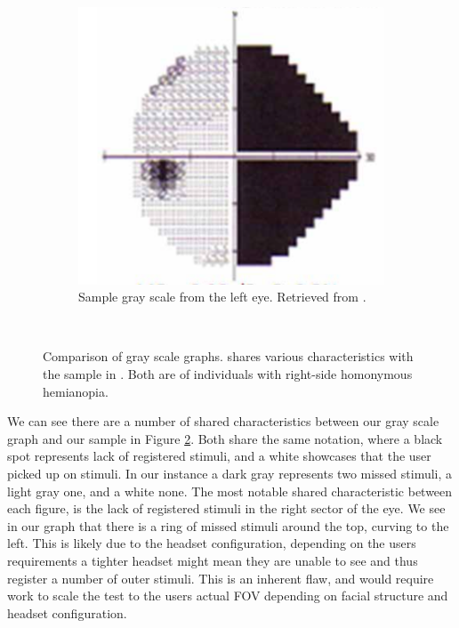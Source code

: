 \documentclass{l4proj}
\begin{document}
\begin{figure}[htbp]
\begin{subfigure}[b]{0.49\textwidth}
        \includegraphics[width=\textwidth]{dissertation/images/sample_left_gs.png}
        \caption{Sample gray scale from the left eye. Retrieved from \citet{perez2014rehabilitation}.}
        \label{fig:sample_left_gs}
    \end{subfigure}
    ~  
    \caption{Comparison of gray scale graphs.  shares various characteristics with the sample in . Both are of individuals with right-side homonymous hemianopia.}\label{fig:gs_comparison}
\end{figure}
\newline
We can see there are a number of shared characteristics between our gray scale graph and our sample in Figure \ref{fig:gs_comparison}. Both share the same notation, where a black spot represents lack of registered stimuli, and a white showcases that the user picked up on stimuli. In our instance a dark gray represents two missed stimuli, a light gray one, and a white none. The most notable shared characteristic between each figure, is the lack of registered stimuli in the right sector of the eye. We see in our graph that there is a ring of missed stimuli around the top, curving to the left. This is likely due to the headset configuration, depending on the users requirements a tighter headset might mean they are unable to see and thus register a number of outer stimuli. This is an inherent flaw, and would require work to scale the test to the users actual FOV depending on facial structure and headset configuration. 
\end{document}
